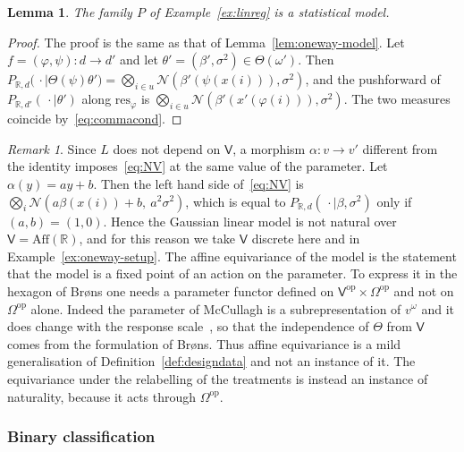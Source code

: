 \documentclass[11pt,a4paper]{article}
\theoremstyle{plain}
\newtheorem{lemma}[theorem]{Lemma}
\theoremstyle{definition}
\theoremstyle{remark}
\newtheorem{caveat}[theorem]{Remark}
\newcommand{\cat}[1]{\mathsf{#1}}
\newcommand{\catV}{\cat{V}}
\newcommand{\catO}{\cat{\Omega}}
\newcommand{\op}{\mathrm{op}}
\newcommand{\R}{\mathbb{R}}
\newcommand{\Norm}{\mathcal{N}}
\newcommand{\res}{\mathrm{res}}
\begin{document}
\begin{lemma}\label{lem:linreg-model}
The family $P$ of Example~\ref{ex:linreg} is a statistical model.
\end{lemma}

\begin{proof}
The proof is the same as that of Lemma~\ref{lem:oneway-model}. Let
$f=(\varphi,\psi) \colon d \to d'$ and let $\theta'=(\beta',\sigma^{2}) \in
\Theta(\omega')$. Then $P_{\R,d}\bigl(\,\cdot \mid \Theta(\psi)\theta'\bigr)
= \bigotimes_{i\in u}\Norm(\beta'(\psi(x(i))),\sigma^{2})$, and the pushforward
of $P_{\R,d'}(\,\cdot\mid\theta')$ along $\res_{\varphi}$ is
$\bigotimes_{i\in u}\Norm(\beta'(x'(\varphi(i))),\sigma^{2})$. The two measures
coincide by~\eqref{eq:commacond}.
\end{proof}

\begin{caveat}\label{cav:scaleV}
Since $L$ does not depend on $\catV$, a morphism $\alpha \colon v \to v'$
different from the identity imposes~\eqref{eq:NV} at the same value of the
parameter. Let $\alpha(y)=ay+b$. Then the left hand side of~\eqref{eq:NV} is
$\bigotimes_{i}\Norm(a\beta(x(i))+b,\ a^{2}\sigma^{2})$, which is equal to
$P_{\R,d}(\,\cdot\mid\beta,\sigma^{2})$ only if $(a,b)=(1,0)$. Hence the
Gaussian linear model is not natural over $\catV = \mathrm{Aff}(\R)$, and for
this reason we take $\catV$ discrete here and in
Example~\ref{ex:oneway-setup}. The affine equivariance of the model is the
statement that the model is a fixed point of an action on the parameter. To
express it in the hexagon of Br\o ns one needs a parameter functor defined on
$\catV^{\op}\times\catO^{\op}$ and not on $\catO^{\op}$ alone. Indeed the
parameter of McCullagh is a subrepresentation of $v^{\omega}$ and it does
change with the response scale~\cite[p.~1235]{mccullagh_what_2002}, so that
the independence of $\Theta$ from $\catV$ comes from the formulation of
Br\o ns. Thus affine equivariance is a mild generalisation of
Definition~\ref{def:designdata} and not an instance of it. The equivariance
under the relabelling of the treatments is instead an instance of naturality,
because it acts through $\catO^{\op}$.
\end{caveat}

\subsubsection{Binary classification}
\end{document}
